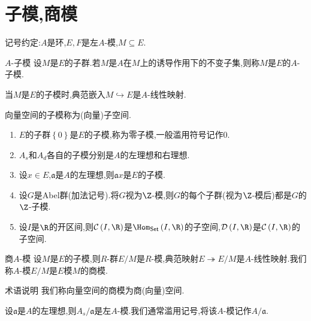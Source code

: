 \section{子模,商模}

记号约定:$A$是环,$E,F$是左$A$-模,$M\subseteq E$.

\begin{definition}{$A$-子模}{}
	设$M$是$E$的子群.若$M$是$A$在$M$上的诱导作用下的不变子集,则称$M$是$E$的$A$-子模.
\end{definition}

\begin{remark}{}{}
	当$M$是$E$的子模时,典范嵌入$M\hookrightarrow E$是$A$-线性映射.
\end{remark}

\begin{remark}{}{}
	向量空间的子模称为(向量)子空间.
\end{remark}

\begin{example}{}{}
	\begin{enumerate}
		\item $E$的子群$\left\{0\right\}$是$E$的子模,称为零子模,一般滥用符号记作$0$.
		\item $A_{s}$和$A_{d}$各自的子模分别是$A$的左理想和右理想.
		\item 设$x\in E$,$\mathfrak{a}$是$A$的左理想,则$\mathfrak{a}x$是$E$的子模.
		\item 设$G$是Abel群(加法记号).将$G$视为$\Z$-模,则$G$的每个子群(视为$\Z$-模后)都是$G$的$\Z$-子模.
		\item 设$I$是$\R$的开区间,则$\mathcal{C}\left(I,\R\right)$是$\Hom_{\mathsf{Set}}\left(I,\R\right)$的子空间,$\mathcal{D}\left(I,\R\right)$是$\mathcal{C}\left(I,\R\right)$的子空间.
	\end{enumerate}
\end{example}

\begin{definition}{商$A$-模}{}
	设$M$是$E$的子模,则$R$-群$E/M$是$R$-模,典范映射$E\twoheadrightarrow E/M$是$A$-线性映射.我们称$A$-模$E/M$是$E$模$M$的商模.
\end{definition}

\begin{remark}{术语说明}{}
	我们称向量空间的商模为商(向量)空间.
\end{remark}

\begin{example}{}{}
	设$\mathfrak{a}$是$A$的左理想,则$A_{s}/\mathfrak{a}$是左$A$-模.我们通常滥用记号,将该$A$-模记作$A/\mathfrak{a}$.
\end{example}

